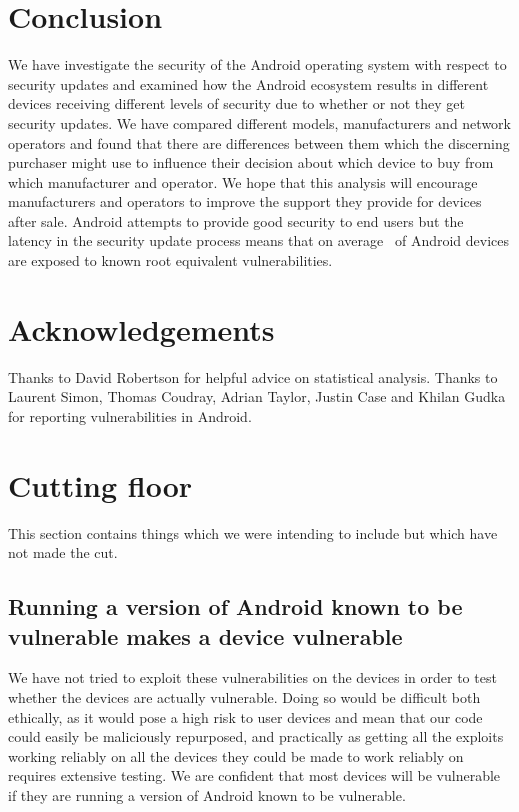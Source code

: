 \documentclass[conference,a4paper,twoside]{IEEEtran}
\let\OldTodo\todo
\renewcommand{\todo}{\OldTodo[inline]}
\begin{document}
\section{Conclusion}
\label{sec:conclusion}
We have investigate the security of the Android operating system with respect to security updates and examined how the Android ecosystem results in different devices receiving different levels of security due to whether or not they get security updates.
We have compared different models, manufacturers and network operators and found that there are differences between them which the discerning purchaser might use to influence their decision about which device to buy from which manufacturer and operator.
We hope that this analysis will encourage manufacturers and operators to improve the support they provide for devices after sale.
Android attempts to provide good security to end users but the latency in the security update process means that on average \daMeanInsecurityPerc\ of Android devices are exposed to known root equivalent vulnerabilities.


\section*{Acknowledgements}
Thanks to David Robertson for helpful advice on statistical analysis.
Thanks to Laurent Simon, Thomas Coudray, Adrian Taylor, Justin Case and Khilan Gudka for reporting vulnerabilities in Android.


\printbibliography


\listoftodos


\section{Cutting floor}

This section contains things which we were intending to include but which have not made the cut.

\subsection{Running a version of Android known to be vulnerable makes a device vulnerable}
We have not tried to exploit these vulnerabilities on the devices in order to test whether the devices are actually vulnerable.
Doing so would be difficult both ethically, as it would pose a high risk to user devices and mean that our code could easily be maliciously repurposed, and practically as getting all the exploits working reliably on all the devices they could be made to work reliably on requires extensive testing.
We are confident that most devices will be vulnerable if they are running a version of Android known to be vulnerable. \todo{WHY?}
\end{document}
